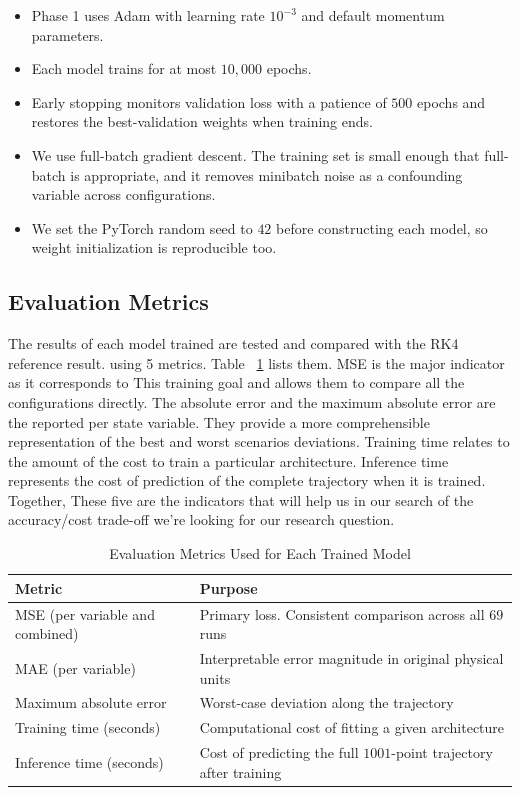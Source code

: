 \begin{itemize}
    \item Phase 1 uses Adam with learning rate $10^{-3}$ and default momentum parameters.
    \item Each model trains for at most $10{,}000$ epochs.
    \item Early stopping monitors validation loss with a patience of $500$ epochs and restores the best-validation weights when training ends.
    \item We use full-batch gradient descent. The training set is small enough that full-batch is appropriate, and it removes minibatch noise as a confounding variable across configurations.
    \item We set the PyTorch random seed to $42$ before constructing each model, so weight initialization is reproducible too.
\end{itemize}


\subsection{Evaluation Metrics}
The results of each model trained are tested and compared with the RK4 reference result.
using 5 metrics. Table ~\ref{tab:metrics}  lists them. MSE is the major indicator as it corresponds to This training goal and allows them to compare all the configurations directly. The absolute
error and the maximum absolute error are the reported per state variable. They provide a
more comprehensible representation of the best and worst scenarios deviations. Training
time relates to the amount of the cost to train a particular architecture. Inference time
represents the cost of prediction of the complete trajectory when it is trained. Together,
These five are the indicators that will help us in our search of the accuracy/cost trade-off we're looking for our research question.

\begin{table}[H]
\centering
\caption{Evaluation Metrics Used for Each Trained Model}
\label{tab:metrics}
\renewcommand{\arraystretch}{1.2}
\begin{tabular}{|l|p{9.5cm}|}
\hline
\textbf{Metric} & \textbf{Purpose} \\
\hline
MSE (per variable and combined) & Primary loss. Consistent comparison across all $69$ runs \\
\hline
MAE (per variable) & Interpretable error magnitude in original physical units \\
\hline
Maximum absolute error & Worst-case deviation along the trajectory \\
\hline
Training time (seconds) & Computational cost of fitting a given architecture \\
\hline
Inference time (seconds) & Cost of predicting the full $1001$-point trajectory after training \\
\hline
\end{tabular}
\end{table}

